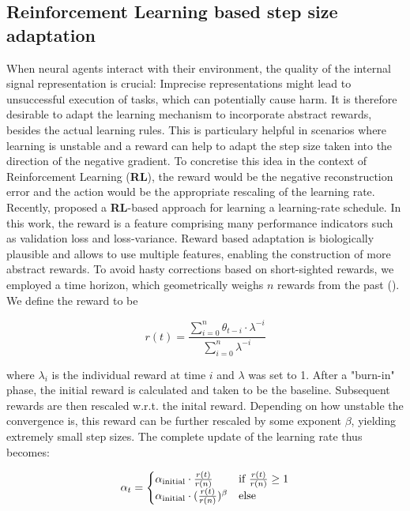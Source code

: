\documentclass[twoside,11pt]{article}
\begin{document}
\subsection{Reinforcement Learning based step size adaptation} \label{sec:rl}
When neural agents interact with their environment, the quality of the internal signal representation
is crucial: Imprecise representations might lead to unsuccessful execution of tasks, which can
potentially cause harm. It is therefore desirable to adapt the learning mechanism to incorporate
abstract rewards, besides the actual learning rules. This is particulary helpful in scenarios where
learning is unstable and a reward can help to adapt the step size taken into the direction of the
negative gradient. To concretise this idea in the context of Reinforcement Learning (\textbf{RL}), the
reward would be the negative reconstruction error and the action would be the appropriate rescaling of the
learning rate. Recently, \cite{xu2019learning} proposed a \textbf{RL}-based approach for learning a
learning-rate schedule. In this work, the reward is a feature comprising many performance indicators
such as validation loss and loss-variance. Reward based adaptation is biologically plausible
and allows to use multiple features,
enabling the construction of more abstract rewards. To avoid hasty corrections based
on short-sighted rewards, we employed a time horizon, which geometrically weighs $n$ rewards from the past
(\cite{Sutton1988}).
We define the reward to be

\begin{equation*} \label{eq:reward}
    r(t) = \frac{\sum_{i=0}^{n}{\theta_{t-i} \cdot \lambda^{-i}}}{\sum_{i=0}^{n}{\lambda^{-i}}}
\end{equation*}

where $\lambda_i$ is the individual reward at time $i$ and $\lambda$ was set to 1.
After a "burn-in" phase, the initial reward is calculated and taken to be the baseline. Subsequent
rewards are then rescaled w.r.t. the inital reward. Depending on how unstable the convergence is,
this reward can be further rescaled by some exponent $\beta$, yielding extremely small step sizes.
The complete update of the learning rate thus becomes:

\begin{equation*}
  \alpha_{t} =
    \begin{cases}
      \alpha_{\textnormal{initial}} \cdot \frac{r(t)}{r(n)} & \text{if $\frac{r(t)}{r(n)} \geq 1$}\\
      \alpha_{\textnormal{initial}} \cdot (\frac{r(t)}{r(n)})^{\beta} & \text{else}
    \end{cases}
\end{equation*}
\end{document}
